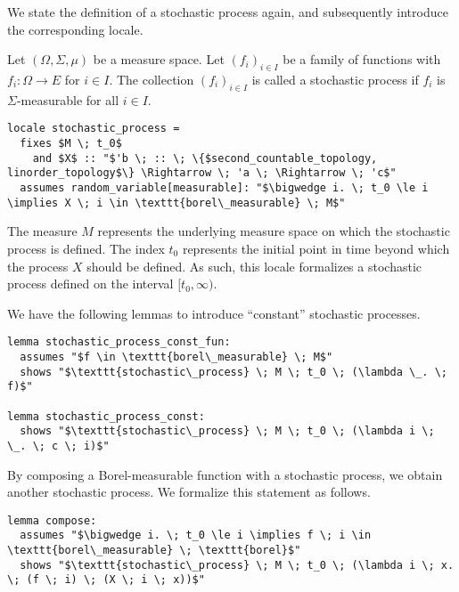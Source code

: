 We state the definition of a stochastic process again, and subsequently introduce the corresponding locale.

\begin{definition}
	Let $(\Omega, \Sigma, \mu)$ be a measure space. Let $(f_i)_{i \in I}$ be a family of functions with $f_i : \Omega \rightarrow E$ for $i \in I$. The collection $(f_i)_{i \in I}$ is called a stochastic process if $f_i$ is $\Sigma$-measurable for all $i \in I$.
\end{definition}

\begin{isadefinition}
{\small
\begin{lstlisting}[style=isabelle]
locale stochastic_process =
  fixes $M \; t_0$ 
    and $X$ :: "$'b \; :: \; \{$second_countable_topology, linorder_topology$\} \Rightarrow \; 'a \; \Rightarrow \; 'c$"
  assumes random_variable[measurable]: "$\bigwedge i. \; t_0 \le i \implies X \; i \in \texttt{borel\_measurable} \; M$"
\end{lstlisting}
}
\end{isadefinition}

The measure $M$ represents the underlying measure space on which the stochastic process is defined. The index $t_0$ represents the initial point in time beyond which the process $X$ should be defined. As such, this locale formalizes a stochastic process defined on the interval $[t_0, \infty)$. 

We have the following lemmas to introduce ``constant'' stochastic processes.

\begin{isalemma}
{\small
\begin{lstlisting}[style=isabelle]
lemma stochastic_process_const_fun:
  assumes "$f \in \texttt{borel\_measurable} \; M$"
  shows "$\texttt{stochastic\_process} \; M \; t_0 \; (\lambda \_. \; f)$"

lemma stochastic_process_const:
  shows "$\texttt{stochastic\_process} \; M \; t_0 \; (\lambda i \; \_. \; c \; i)$" 

\end{lstlisting}
}
\end{isalemma}

By composing a Borel-measurable function with a stochastic process, we obtain another stochastic process. We formalize this statement as follows.

\begin{isalemma}
{\small
\begin{lstlisting}[style=isabelle]
lemma compose:
  assumes "$\bigwedge i. \; t_0 \le i \implies f \; i \in \texttt{borel\_measurable} \; \texttt{borel}$"
  shows "$\texttt{stochastic\_process} \; M \; t_0 \; (\lambda i \; x. \; (f \; i) \; (X \; i \; x))$"
  \end{lstlisting}
}
\end{isalemma}

